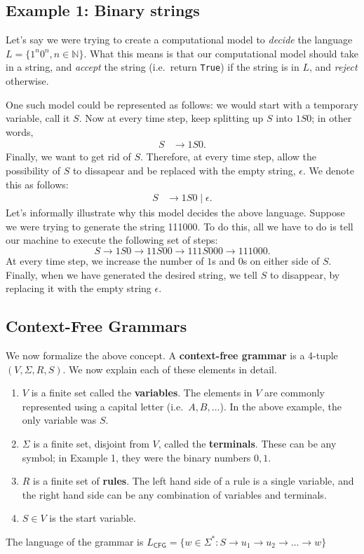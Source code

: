 \documentclass{article}
\begin{document}
\subsection*{Example 1: Binary strings}
    Let's say we were trying to create a computational model to \textit{decide} the language $L = \{1^{n}0^{n}, n \in \mathbb{N}\}$. What this means is that our computational model should take in a string, and \textit{accept} the string (i.e.\ return \texttt{True}) if the string is in $L$, and \textit{reject} otherwise.

    \vspace{2mm}
    One such model could be represented as follows: we would start with a temporary variable, call it $S$. Now at every time step, keep splitting up $S$ into $1S0$; in other words,
    \begin{align*}
        S &\rightarrow 1S0.
    \end{align*}
    Finally, we want to get rid of $S$. Therefore, at every time step, allow the possibility of $S$ to dissapear and be replaced with the empty string, $\epsilon$. We denote this as follows:
    \begin{align*}
        S &\rightarrow 1S0 \mid \epsilon.
    \end{align*}
    Let's informally illustrate why this model decides the above language. Suppose we were trying to generate the string 111000. To do this, all we have to do is tell our machine to execute the following set of steps:
    $$S \rightarrow 1S0 \rightarrow 11S00 \rightarrow 111S000 \rightarrow 111000.$$ At every time step, we increase the number of $1$s and $0$s on either side of $S$. Finally, when we have generated the desired string, we tell $S$ to disappear, by replacing it with the empty string $\epsilon$.

\subsection*{Context-Free Grammars}
    We now formalize the above concept. A \textbf{context-free grammar} is a 4-tuple $(V, \Sigma, R, S)$. We now explain each of these elements in detail.
    \begin{enumerate}[label = \arabic*.]
        \item $V$ is a finite set called the \textbf{variables}. The elements in $V$ are commonly represented using a capital letter (i.e.\ $A, B, \dots$). In the above example, the only variable was $S$.
        \item $\Sigma$ is a finite set, disjoint from $V$, called the \textbf{terminals}. These can be any symbol; in Example 1, they were the binary numbers $0, 1$.
        \item $R$ is a finite set of \textbf{rules}. The left hand side of a rule is a single variable, and the right hand side can be any combination of variables and terminals.
        \item $S \in V$ is the start variable.
    \end{enumerate}
    The language of the grammar is $L_{\textsf{CFG}} = \{w \in \Sigma^{*} : S \rightarrow u_{1} \rightarrow u_{2} \rightarrow \dots \rightarrow w\}$
\end{document}
